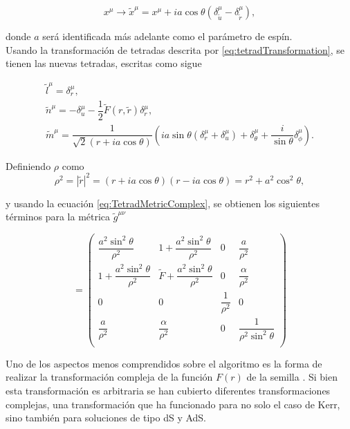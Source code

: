 \begin{equation}
    x^\mu\rightarrow\tilde{x}^\mu=x^\mu+ia\cos\theta(\delta^\mu_{\tilde{u}}-\delta^\mu_{\tilde{r}}),
\end{equation}

donde $a$ será identificada más adelante como el parámetro de espín.\\

Usando la transformación de tetradas descrita por \eqref{eq:tetradTransformation}, se tienen las nuevas tetradas, escritas como sigue \cite{AplicabilityOfJN}

\begin{gather}
    \tilde{l}^\mu = \delta^\mu_r,\\
    \tilde{n}^\mu = -\delta^\mu_u-\dfrac{1}{2}\tilde{F}(r,\tilde{r})\delta^\mu_r,\\
    \tilde{m}^\mu = \dfrac{1}{\sqrt{2}(r+ia\cos\theta)}\left(ia\sin\theta\left(\delta^\mu_r+\delta^\mu_u\right)+\delta^\mu_\theta+\dfrac{i}{\sin\theta}\delta^\mu_\phi\right).
\end{gather}

Definiendo $\rho$ como 
\begin{equation}
    \rho^2 = |\tilde{r}|^2 = (r+ia\cos\theta)(r-ia\cos\theta)=r^2+a^2\cos^2\theta,
\end{equation}

y usando la ecuación \eqref{eq:TetradMetricComplex}, se obtienen los siguientes términos para la métrica $\tilde{g}^{\mu\nu}$

\begin{equation}
    [g^{\mu\nu}]=
    \begin{pmatrix}
        \dfrac{a^2\sin^2\theta}{\rho^2} & 1+ \dfrac{a^2\sin^2\theta}{\rho^2} &   0 &     \dfrac{a}{\rho^2}\\
        1+ \dfrac{a^2\sin^2\theta}{\rho^2} &    \tilde{F}+\dfrac{a^2\sin^2\theta}{\rho^2} &   0 &   \dfrac{\alpha}{\rho^2}\\
        0 &    0&   \dfrac{1}{\rho^2} &  0\\
         \dfrac{a}{\rho^2}    & \dfrac{\alpha}{\rho^2}   &   0&   \dfrac{1}{\rho^2\sin^2\theta} \\
    \end{pmatrix}
    \label{eq:MetricaRotanteContravariante}
\end{equation}

Uno de los aspectos menos comprendidos sobre el algoritmo es la forma de realizar la transformación compleja de la función $F(r)$ de la semilla \cite{AnExtensionOfJN, JN-RotatingAndNUTCharged}. Si bien esta transformación es arbitraria se han cubierto diferentes transformaciones complejas, una transformación que ha funcionado para no solo el caso de Kerr, sino también para soluciones de tipo dS y AdS.\\

